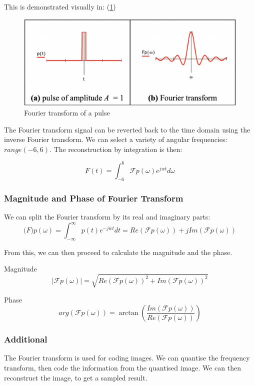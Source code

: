 This is demonstrated visually in: (\ref{fig:fourier})

\begin{figure}[h!]
    \centering
    \includegraphics[scale=0.2]{Images/fourier.png}
    \caption{Fourier transform of a pulse}
    \label{fig:fourier}
\end{figure}

The Fourier transform signal can be reverted back to the time domain using the inverse Fourier transform. We can select a variety of angular frequencies: $range(-6,6)$. The reconstruction by integration is then:

\begin{equation}
    F(t) = \int_{-6}^{6} \mathcal{F}p(\omega)e^{jwt}d\omega
\end{equation}

\subsubsection{Magnitude and Phase of Fourier Transform}
We can split the Fourier transform by its real and imaginary parts:
\begin{equation}
    \mathcal(F)p(\omega) = \int_{-\infty}^{\infty}p(t)e^{-jwt}dt = Re(\mathcal{F}p(\omega)) + \textit{j}Im(\mathcal{F}p(\omega))
\end{equation}

From this, we can then proceed to calculate the magnitude and the phase.

Magnitude
\begin{equation}
    |\mathcal{F}p(\omega)| = \sqrt{Re(\mathcal{F}p(\omega))^{2} + Im(\mathcal{F}p(\omega))^{2}}
\end{equation}

Phase
\begin{equation}
    arg(\mathcal{F}p(\omega)) = \arctan \left( \frac{Im(\mathcal{F}p(\omega))}{Re(\mathcal{F}p(\omega))}
    \right)
\end{equation}

\subsubsection{Additional}

The Fourier transform is used for coding images. We can quantise the frequency transform, then code the information from the quantised image. We can then reconstruct the image, to get a sampled result.